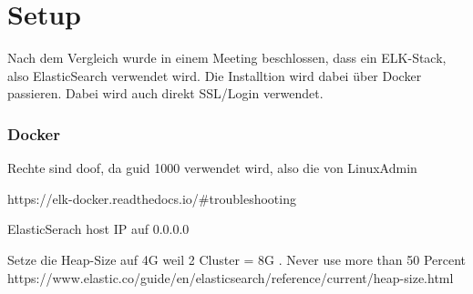 \chapter{Setup}

Nach dem Vergleich wurde in einem Meeting beschlossen, dass ein ELK-Stack, also ElasticSearch verwendet wird. Die Installtion wird dabei über Docker passieren. Dabei wird auch direkt SSL/Login verwendet. 

\subsection{Docker}

Rechte sind doof, da guid 1000 verwendet wird, also die von LinuxAdmin

https://elk-docker.readthedocs.io/#troubleshooting

ElasticSerach host IP auf 0.0.0.0


Setze die Heap-Size auf 4G weil 2 Cluster = 8G . Never use more than 50 Percent https://www.elastic.co/guide/en/elasticsearch/reference/current/heap-size.html